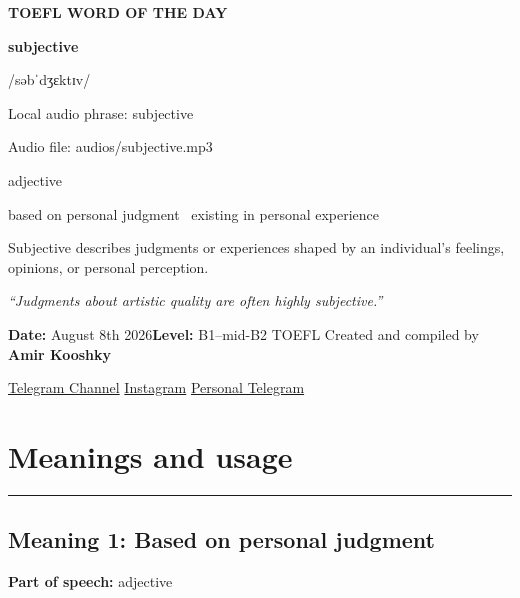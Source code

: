 \documentclass[11pt]{article}
\newcommand{\sectionrule}{\par\vspace{-0.5em}\noindent\textcolor{Accent}{\rule{\linewidth}{0.6pt}}\par}
\begin{document}
\begin{center}
{\sffamily\bfseries\color{Accent} TOEFL WORD OF THE DAY\par}
\vspace{8mm}
{\fontsize{42}{48}\selectfont\bfseries subjective\par}
\vspace{2mm}
{\Large\sffamily\color{Accent} /səbˈdʒɛktɪv/\par}
\vspace{2mm}
{\small\sffamily Local audio phrase: subjective\par}
{\small\sffamily Audio file: audios/subjective.mp3\par}
\vspace{2mm}
{\large\sffamily\color{Muted} adjective\par}
\vspace{5mm}
{\sffamily based on personal judgment \textbullet\ existing in personal experience\par}
\vspace{6mm}
{\large Subjective describes judgments or experiences shaped by an individual's feelings, opinions, or personal perception.\par}
\vspace{6mm}
\begin{minipage}{0.84\textwidth}
\itshape “Judgments about artistic quality are often highly subjective.”
\end{minipage}\par
\vspace{10mm}
\textbf{Date:} August 8th 2026\quad\textbullet\quad \textbf{Level:} B1--mid-B2 TOEFL
\vfill
Created and compiled by \textbf{Amir Kooshky}\par
\vspace{2mm}
\href{https://t.me/KooshkyTOEFL}{Telegram Channel}\quad\textbullet\quad
\href{https://www.instagram.com/kooshkytoefl}{Instagram}\quad\textbullet\quad
\href{https://t.me/KooshkyTOEFL\_pv}{Personal Telegram}
\end{center}
\newpage
\tableofcontents
\newpage

\section{Meanings and usage}
\sectionrule
\subsection{Meaning 1: Based on personal judgment}
\textbf{Part of speech:} adjective
\end{document}
